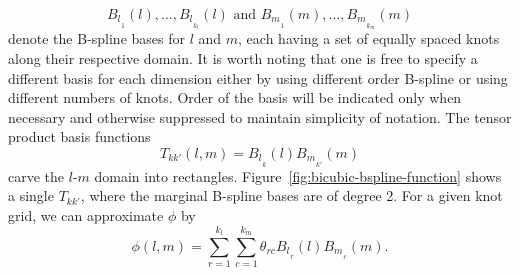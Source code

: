 \[
{B_l}_{_1}\left(l\right),\dots, {B_l}_{_{k_l}}\left(l\right)  \mbox{ and } {B_m}_{_1}\left(m\right),\dots, {B_m}_{_{k_m}}\left(m\right)
\]
\noindent
denote the B-spline bases for $l$ and $m$, each having a set of equally spaced knots along their respective domain. It is worth noting that one is free to specify a different basis for each dimension either by using different order B-spline or using different numbers of knots. Order of the basis will be indicated only when necessary and otherwise suppressed to maintain simplicity of notation. The tensor product basis functions
\begin{equation*}
T_{kk'}\left(l,m\right) = {B_l}_{_k}\left(l\right){B_m}_{_{k'}}\left(m\right)
\end{equation*}
\noindent
carve the $l$-$m$ domain into rectangles. Figure~\ref{fig:bicubic-bspline-function} shows a single $T_{kk'}$, where the marginal B-spline bases are of degree 2. For a given knot grid, we can approximate $\phi$ by
\begin{equation} \label{eq:tensor-product-bspline-expansion-phi}
\phi\left(l,m\right) = \sum_{r=1}^{k_l} \sum_{c=1}^{k_m} \theta_{rc} {B_l}_{_r}\left(l\right) {B_m}_{_c}\left(m\right). 
\end{equation}
\noindent
